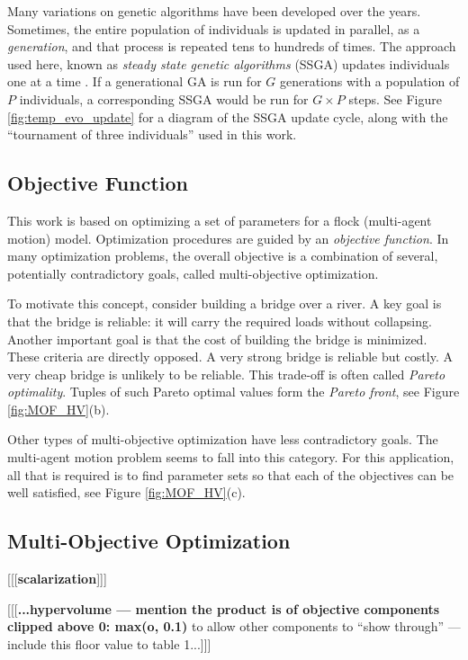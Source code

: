 \documentclass[letterpaper]{article}
\begin{document}
Many variations on genetic algorithms have been developed over the years. Sometimes, the entire population of individuals is updated in parallel, as a \textit{generation}, and that process is repeated tens to hundreds of times. The approach used here, known as \textit{steady state genetic algorithms} (SSGA) updates individuals one at a time \citep{syswerda_study_1991}. If a generational GA is run for $G$ generations with a population of $P$ individuals, a corresponding SSGA would be run for $G{\times}P$ steps. See Figure \ref{fig:temp_evo_update} for a diagram of the SSGA update cycle, along with the ``tournament of three individuals'' used in this work.

\subsection{Objective Function}
\label{subsec:ObjectiveFunction}

This work is based on optimizing a set of parameters for a flock (multi-agent motion) model. Optimization procedures are guided by an \textit{objective function}. In many optimization problems, the overall objective is a combination of several, potentially contradictory goals, called multi-objective optimization. 

To motivate this concept, consider building a bridge over a river. A key goal is that the bridge is reliable: it will carry the required loads without collapsing. Another important goal is that the cost of building the bridge is minimized. These criteria are directly opposed. A very strong bridge is reliable but costly. A very cheap bridge is unlikely to be reliable. This trade-off is often called \textit{Pareto optimality}. Tuples of such Pareto optimal values form the \textit{Pareto front}, see Figure \ref{fig:MOF_HV}(b).

Other types of multi-objective optimization have less contradictory goals. The multi-agent motion problem seems to fall into this category. For this application, all that is required is to find parameter sets so that each of the objectives can be well satisfied, see Figure \ref{fig:MOF_HV}(c).

\subsection{Multi-Objective Optimization}
\label{subsec:Multi-Objective}

[[[\textbf{scalarization}]]]

[[[\textbf{...hypervolume --- mention the product is of objective components clipped above 0: max(o, 0.1)} to allow other components to ``show through'' --- include this floor value to table 1...]]]
\end{document}
